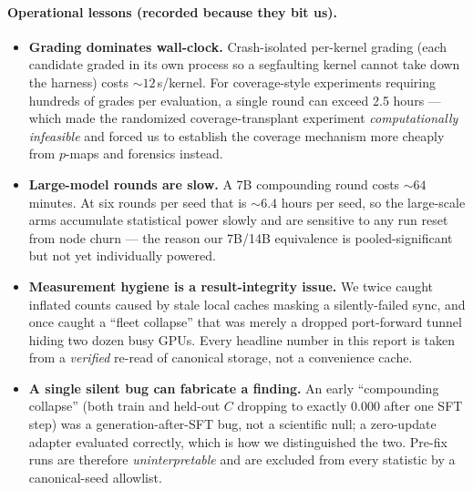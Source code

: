 \paragraph{Operational lessons (recorded because they bit us).}
\begin{itemize}[leftmargin=1.4em,itemsep=1pt]
\item \textbf{Grading dominates wall-clock.} Crash-isolated per-kernel grading (each candidate graded in its own
process so a segfaulting kernel cannot take down the harness) costs ${\sim}12$\,s/kernel. For coverage-style
experiments requiring hundreds of grades per evaluation, a single round can exceed 2.5 hours --- which made the
randomized coverage-transplant experiment \emph{computationally infeasible} and forced us to establish the
coverage mechanism more cheaply from $p$-maps and forensics instead.
\item \textbf{Large-model rounds are slow.} A 7B compounding round costs ${\sim}64$ minutes. At six rounds per
seed that is ${\sim}6.4$ hours per seed, so the large-scale arms accumulate statistical power slowly and are
sensitive to any run reset from node churn --- the reason our 7B/14B equivalence is pooled-significant but not
yet individually powered.
\item \textbf{Measurement hygiene is a result-integrity issue.} We twice caught inflated counts caused by stale
local caches masking a silently-failed sync, and once caught a ``fleet collapse'' that was merely a dropped
port-forward tunnel hiding two dozen busy GPUs. Every headline number in this report is taken from a
\emph{verified} re-read of canonical storage, not a convenience cache.
\item \textbf{A single silent bug can fabricate a finding.} An early ``compounding collapse'' (both train and
held-out $C$ dropping to exactly $0.000$ after one SFT step) was a generation-after-SFT bug, not a scientific
null; a zero-update adapter evaluated correctly, which is how we distinguished the two. Pre-fix runs are
therefore \emph{uninterpretable} and are excluded from every statistic by a canonical-seed allowlist.
\end{itemize}


